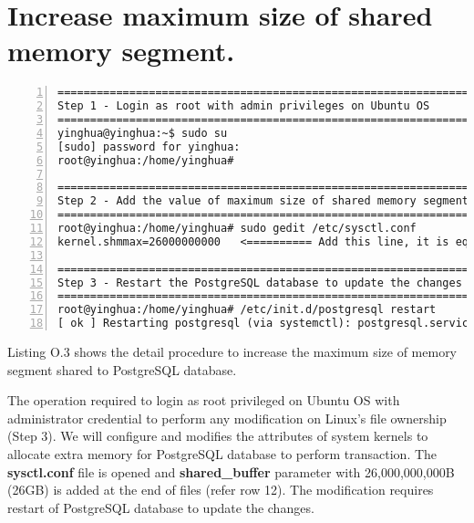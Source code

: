 \newpage

\section{Increase maximum size of shared memory segment.}

\lstset{basicstyle=\ttfamily\tiny}  
\begin{lstlisting}[breaklines, frame=single, numbers=left, caption={Increase maximum size of shared memory segment.}, label=commandline-02]
==================================================================================
Step 1 - Login as root with admin privileges on Ubuntu OS 
==================================================================================
yinghua@yinghua:~$ sudo su 
[sudo] password for yinghua: 
root@yinghua:/home/yinghua# 

================================================================================================
Step 2 - Add the value of maximum size of shared memory segment into Ubuntu System Configuration
================================================================================================
root@yinghua:/home/yinghua# sudo gedit /etc/sysctl.conf
kernel.shmmax=26000000000	<========== Add this line, it is equal to 26GB 

===================================================================================
Step 3 - Restart the PostgreSQL database to update the changes 
==================================================================================
root@yinghua:/home/yinghua# /etc/init.d/postgresql restart
[ ok ] Restarting postgresql (via systemctl): postgresql.service.

\end{lstlisting}

Listing O.3 shows the detail procedure to increase the maximum size of memory segment shared to PostgreSQL database. 

The operation required to login as root privileged on Ubuntu OS with administrator credential to perform any modification on Linux's file ownership (Step 3). We will configure and modifies the attributes of system kernels to allocate extra memory for PostgreSQL database to perform transaction. The \textbf{sysctl.conf} file is opened and \textbf{shared\_buffer} parameter with 26,000,000,000B (26GB) is added at the end of files (refer row 12). The modification requires restart of PostgreSQL database to update the changes. 